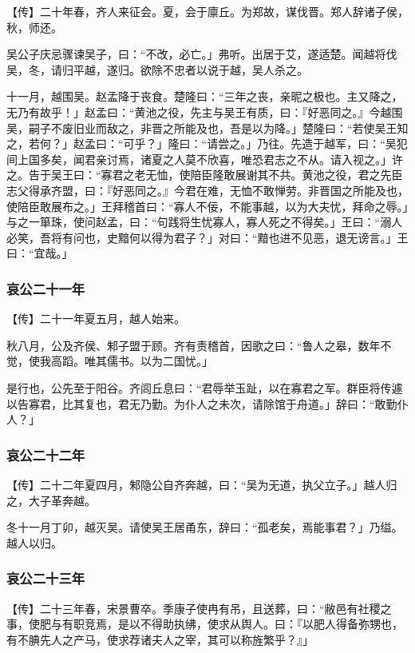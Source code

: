 \documentclass[]{article}
\begin{document}
【传】二十年春，齐人来征会。夏，会于廪丘。为郑故，谋伐晋。郑人辞诸子侯，秋，师还。

吴公子庆忌骤谏吴子，曰：``不改，必亡。」弗听。出居于艾，遂适楚。闻越将伐吴，冬，请归平越，遂归。欲除不忠者以说于越，吴人杀之。

十一月，越围吴。赵孟降于丧食。楚隆曰：``三年之丧，亲昵之极也。主又降之，无乃有故乎！」赵孟曰：``黄池之役，先主与吴王有质，曰：『好恶同之。』今越围吴，嗣子不废旧业而敌之，非晋之所能及也，吾是以为降。」楚隆曰：``若使吴王知之，若何？」赵孟曰：``可乎？」隆曰：``请尝之。」乃往。先造于越军，曰：``吴犯间上国多矣，闻君亲讨焉，诸夏之人莫不欣喜，唯恐君志之不从。请入视之。」许之。告于吴王曰：``寡君之老无恤，使陪臣隆敢展谢其不共。黄池之役，君之先臣志父得承齐盟，曰：『好恶同之。』今君在难，无恤不敢惮劳。非晋国之所能及也，使陪臣敢展布之。」王拜稽首曰：``寡人不佞，不能事越，以为大夫忧，拜命之辱。」与之一箪珠，使问赵孟，曰：``句践将生忧寡人，寡人死之不得矣。」王曰：``溺人必笑，吾将有问也，史黯何以得为君子？」对曰：``黯也进不见恶，退无谤言。」王曰：``宜哉。」

\hypertarget{header-n3260}{%
\subsubsection{哀公二十一年}\label{header-n3260}}

【传】二十一年夏五月，越人始来。

秋八月，公及齐侯、邾子盟于顾。齐有责稽首，因歌之曰：``鲁人之皋，数年不觉，使我高蹈。唯其儒书。以为二国忧。」

是行也，公先至于阳谷。齐闾丘息曰：``君辱举玉趾，以在寡君之军。群臣将传遽以告寡君，比其复也，君无乃勤。为仆人之未次，请除馆于舟道。」辞曰：``敢勤仆人？」

\hypertarget{header-n3266}{%
\subsubsection{哀公二十二年}\label{header-n3266}}

【传】二十二年夏四月，邾隐公自齐奔越，曰：``吴为无道，执父立子。」越人归之，大子革奔越。

冬十一月丁卯，越灭吴。请使吴王居甬东，辞曰：``孤老矣，焉能事君？」乃缢。越人以归。

\hypertarget{header-n3271}{%
\subsubsection{哀公二十三年}\label{header-n3271}}

【传】二十三年春，宋景曹卒。季康子使冉有吊，且送葬，曰：``敝邑有社稷之事，使肥与有职竞焉，是以不得助执绋，使求从舆人。曰：『以肥人得备弥甥也，有不腆先人之产马，使求荐诸夫人之宰，其可以称旌繁乎？』」
\end{document}
